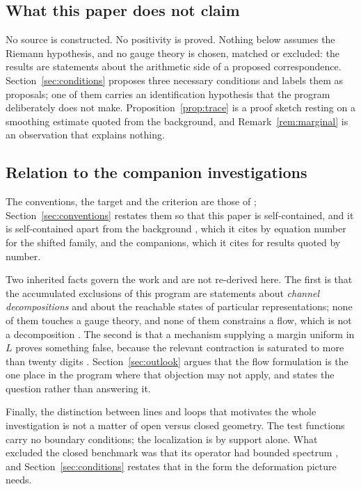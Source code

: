 \subsection*{What this paper does not claim}

No source is constructed. No positivity is proved. Nothing below assumes the
Riemann hypothesis, and no gauge theory is chosen, matched or excluded: the
results are statements about the arithmetic side of a proposed correspondence.
Section~\ref{sec:conditions} proposes three necessary conditions and labels them
as proposals; one of them carries an identification hypothesis that the program
deliberately does not make. Proposition~\ref{prop:trace} is a proof sketch
resting on a smoothing estimate quoted from the background, and
Remark~\ref{rem:marginal} is an observation that explains nothing.

\subsection*{Relation to the companion investigations}

The conventions, the target and the criterion are those of
\cite{InverseBulk,Selection}; Section~\ref{sec:conventions} restates them so that
this paper is self-contained, and it is self-contained apart from the background
\cite{Background}, which it cites by equation number for the shifted family, and
the companions, which it cites for results quoted by number.

Two inherited facts govern the work and are not re-derived here. The first is
that the accumulated exclusions of this program are statements about
\emph{channel decompositions} and about the reachable states of particular
representations; none of them touches a gauge theory, and none of them
constrains a flow, which is not a decomposition \cite{ExclusionMap}. The second
is that a mechanism supplying a margin uniform in $L$ proves something false,
because the relevant contraction is saturated to more than twenty digits
\cite{Selection}. Section~\ref{sec:outlook} argues that the flow formulation is
the one place in the program where that objection may not apply, and states the
question rather than answering it.

Finally, the distinction between lines and loops that motivates the whole
investigation is not a matter of open versus closed geometry. The test functions
carry no boundary conditions; the localization is by support alone. What excluded
the closed benchmark was that its operator had bounded spectrum
\cite{Selection,Bottleneck}, and Section~\ref{sec:conditions} restates that in
the form the deformation picture needs.
